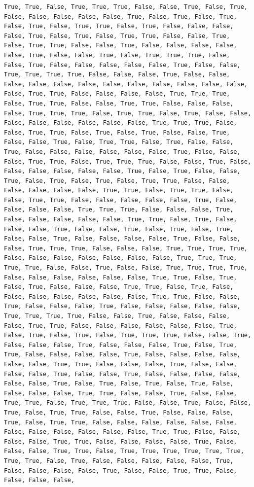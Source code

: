 \documentclass[
  letterpaper,
  DIV=11,
  numbers=noendperiod]{scrartcl}
\begin{document}
\begin{verbatim}
True, True, False, True, True, True, False, False, True, False, True, False, False, False, False, False, True, False, True, False, True, False, True, False, True, True, False, True, False, False, False, False, True, False, True, False, True, True, False, False, True, False, True, True, False, False, True, False, False, False, False, False, True, False, False, True, False, True, True, True, False, False, True, False, False, False, False, False, True, False, False, True, True, True, True, False, False, False, True, False, False, False, False, False, False, False, False, False, False, False, False, False, True, True, False, False, False, False, True, True, True, False, True, True, False, False, True, True, False, False, False, False, True, True, True, False, True, True, False, True, False, False, False, False, False, False, False, False, True, True, True, False, False, True, True, False, True, False, True, False, False, True, False, False, True, False, True, True, False, True, False, False, True, False, False, False, False, False, False, True, False, False, False, True, True, False, True, True, True, False, False, True, False, False, False, False, False, False, True, False, True, False, False, True, False, True, False, True, False, True, True, False, False, False, False, False, False, True, True, False, True, True, False, False, True, True, False, False, False, False, False, True, False, False, False, False, True, True, True, False, False, False, True, False, False, False, False, False, True, True, False, True, False, False, False, True, False, False, True, False, True, False, True, False, False, True, False, False, False, False, True, False, False, False, True, True, True, False, False, False, True, True, True, True, False, False, False, False, False, False, False, True, True, True, True, True, False, False, True, False, False, True, True, True, True, False, False, False, False, False, False, True, True, False, True, False, True, False, False, False, True, True, False, True, False, False, False, False, False, False, False, True, True, False, False, True, False, False, False, True, False, False, False, False, False, True, True, True, True, False, False, True, False, False, False, False, True, True, False, False, False, False, False, False, True, False, True, False, True, False, True, True, True, False, False, True, False, False, False, True, False, False, False, True, False, True, True, False, False, False, False, True, False, False, False, False, False, False, True, True, False, False, False, True, False, False, False, False, True, False, False, True, False, False, False, False, False, False, True, False, True, False, True, False, True, False, False, False, False, True, True, False, False, True, False, False, True, True, False, True, True, True, False, False, True, False, False, True, False, True, True, False, False, True, False, False, False, True, False, True, True, False, False, False, False, False, False, False, False, False, False, False, False, True, True, False, False, False, False, True, True, False, False, False, False, True, False, False, False, True, True, False, True, True, True, True, True, True, True, True, False, True, False, False, False, False, False, True, False, False, False, False, True, False, False, True, True, False, False, False, False, 
\end{verbatim}
\end{document}
